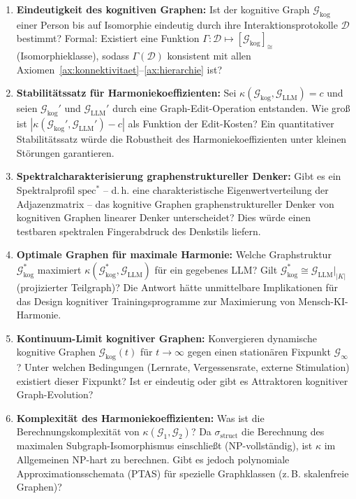 ﻿\documentclass[12pt,a4paper]{article}
\theoremstyle{plain}
\theoremstyle{definition}
\theoremstyle{remark}
\newcommand{\GG}{\mathcal{G}}
\begin{document}
\begin{enumerate}[label=\textbf{(P\arabic*)}]
  \item \textbf{Eindeutigkeit des kognitiven Graphen:} Ist der kognitive Graph $\GG_{\text{kog}}$ einer Person bis auf Isomorphie eindeutig durch ihre Interaktionsprotokolle $\mathcal{D}$ bestimmt? Formal: Existiert eine Funktion $\Gamma: \mathcal{D} \mapsto [\GG_{\text{kog}}]_{\cong}$ (Isomorphieklasse), sodass $\Gamma(\mathcal{D})$ konsistent mit allen Axiomen~\ref{ax:konnektivitaet}--\ref{ax:hierarchie} ist?

  \item \textbf{Stabilitätssatz für Harmoniekoeffizienten:} Sei $\kappa(\GG_{\text{kog}}, \GG_{\text{LLM}}) = c$ und seien $\GG_{\text{kog}}'$ und $\GG_{\text{LLM}}'$ durch eine Graph-Edit-Operation entstanden. Wie groß ist $|\kappa(\GG_{\text{kog}}', \GG_{\text{LLM}}') - c|$ als Funktion der Edit-Kosten? Ein quantitativer Stabilitätssatz würde die Robustheit des Harmoniekoeffizienten unter kleinen Störungen garantieren.

  \item \textbf{Spektralcharakterisierung graphenstruktureller Denker:} Gibt es ein Spektralprofil $\text{spec}^*$ -- d.\,h. eine charakteristische Eigenwertverteilung der Adjazenzmatrix -- das kognitive Graphen graphenstruktureller Denker von kognitiven Graphen linearer Denker unterscheidet? Dies würde einen testbaren spektralen Fingerabdruck des Denkstils liefern.

  \item \textbf{Optimale Graphen für maximale Harmonie:} Welche Graphstruktur $\GG_{\text{kog}}^*$ maximiert $\kappa(\GG_{\text{kog}}^*, \GG_{\text{LLM}})$ für ein gegebenes LLM? Gilt $\GG_{\text{kog}}^* \cong \GG_{\text{LLM}}|_{|K|}$ (projizierter Teilgraph)? Die Antwort hätte unmittelbare Implikationen für das Design kognitiver Trainingsprogramme zur Maximierung von Mensch-KI-Harmonie.

  \item \textbf{Kontinuum-Limit kognitiver Graphen:} Konvergieren dynamische kognitive Graphen $\GG_{\text{kog}}(t)$ für $t \to \infty$ gegen einen stationären Fixpunkt $\GG_\infty$? Unter welchen Bedingungen (Lernrate, Vergessensrate, externe Stimulation) existiert dieser Fixpunkt? Ist er eindeutig oder gibt es Attraktoren kognitiver Graph-Evolution?

  \item \textbf{Komplexität des Harmoniekoeffizienten:} Was ist die Berechnungskomplexität von $\kappa(\GG_1, \GG_2)$? Da $\sigma_{\text{struct}}$ die Berechnung des maximalen Subgraph-Isomorphismus einschließt (NP-vollständig), ist $\kappa$ im Allgemeinen NP-hart zu berechnen. Gibt es jedoch polynomiale Approximationsschemata (PTAS) für spezielle Graphklassen (z.\,B. skalenfreie Graphen)?
\end{enumerate}
\end{document}
